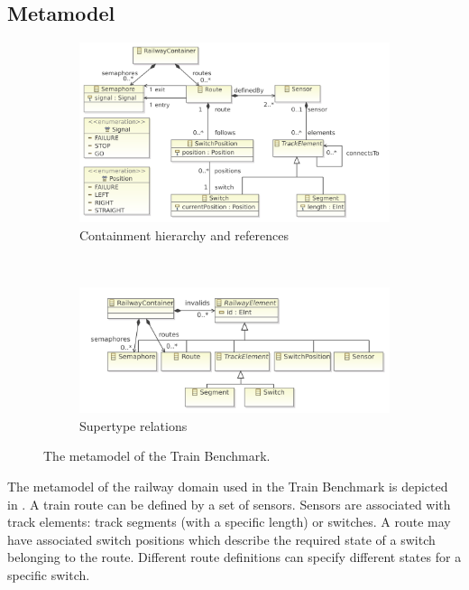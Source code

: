 \subsection{Metamodel}
\label{sec:domain}

\begin{figure}
	\centering
	\begin{subfigure}[b]{\textwidth}
		\centering
		\includegraphics[scale=0.6]{figures/railway-containments}
		\caption{Containment hierarchy and references}
		\label{fig:railway-containments}
	\end{subfigure}
	~
	\begin{subfigure}[b]{\textwidth}
		\centering
		\includegraphics[scale=0.6]{figures/railway-inheritance}
		\caption{Supertype relations}
		\label{fig:railway-inheritance}
	\end{subfigure}
	\caption{The metamodel of the Train Benchmark.}
	\label{fig:metamodel}
\end{figure}

The metamodel of the railway domain used in the Train Benchmark is depicted in . A train \textsf{route} can be defined by a set of \textsf{sensors}. Sensors are associated with \textsf{track elements}: track \textsf{segment}s (with a specific length) or \textsf{switch}es. A route may have associated \textsf{switch positions} which describe the required state of a switch belonging to the route. Different route definitions can specify different states for a specific switch.
 
